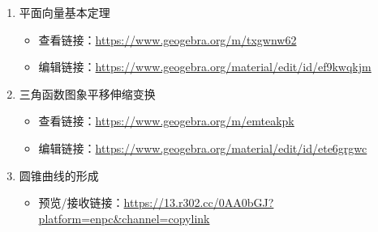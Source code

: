 \begin{enumerate}[label=实验 \arabic*.]
  \item 平面向量基本定理
      \begin{itemize}
          \item 查看链接：\url{https://www.geogebra.org/m/txgwnw62}
          \item 编辑链接：\url{https://www.geogebra.org/material/edit/id/ef9kwqkjm}
      \end{itemize}
  \item 三角函数图象平移伸缩变换
      \begin{itemize}
          \item 查看链接：\url{https://www.geogebra.org/m/emteakpk}
          \item 编辑链接：\url{https://www.geogebra.org/material/edit/id/ete6grgwc}
      \end{itemize}
  \item 圆锥曲线的形成
      \begin{itemize}
          \item 预览/接收链接：\url{https://13.r302.cc/0AA0bGJ?platform=enpc&channel=copylink}
      \end{itemize}
\end{enumerate}